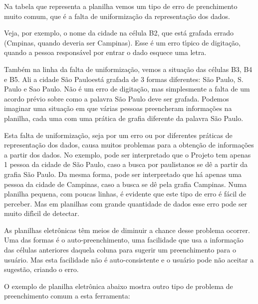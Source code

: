 \documentclass[
12pt,		%
openright,	%
twoside,  %
a4paper,			%
chapter=TITLE,		%
english,			%
french,				%
spanish,			%
brazil				%
]{USPSC-classe/USPSC}
\begin{document}
Na tabela que representa a planilha vemos um tipo de erro de prenchimento muito comum, que \'e a falta de uniformiza\c{c}\~ao da representa\c{c}\~ao dos dados.




Veja, por exemplo, o nome da cidade na c\'elula B2, que est\'a grafada errado (Cmpinas, quando deveria ser Campinas). Esse \'e um erro t\'{\i}pico de digita\c{c}\~ao, quando a pessoa respons\'avel por entrar o dado esquece uma letra.




Tamb\'em na linha da falta de uniformiza\c{c}\~ao, vemos a situa\c{c}\~ao das c\'elulas B3, B4 e B5. Ali a cidade \textquotedbl S\~ao Paulo\textquotedbl  est\'a grafada de 3 formas diferentes: S\~ao Paulo, S. Paulo e Sao Paulo. N\~ao \'e um erro de digita\c{c}\~ao, mas simplesmente a falta de um acordo pr\'evio sobre como a palavra S\~ao Paulo deve ser grafada. Podemos imaginar uma situa\c{c}\~ao em que v\'arias pessoas preencheram informa\c{c}\~oes na planilha, cada uma com uma pr\'atica de grafia diferente da palavra S\~ao Paulo.




Esta falta de uniformiza\c{c}\~ao, seja por um erro ou por diferentes pr\'aticas de representa\c{c}\~ao dos dados, causa muitos problemas para a obten\c{c}\~ao de informa\c{c}\~oes a partir dos dados. No exemplo, pode ser interpretado que o Projeto tem apenas 1 pessoa da cidade de S\~ao Paulo, caso a busca por paulistanos se d\^e a partir da grafia \textquotedbl S\~ao Paulo\textquotedbl . Da mesma forma, pode ser interpretado que h\'a apenas uma pessoa da cidade de Campinas, caso a busca se d\^e pela grafia \textquotedbl Campinas\textquotedbl . Numa planilha pequena, com poucas linhas, \'e evidente que este tipo de erro \'e f\'acil de perceber. Mas em planilhas com grande quantidade de dados esse erro pode ser muito dif\'{\i}cil de detectar.




As planilhas eletr\^onicas t\^em meios de diminuir a chance desse problema ocorrer. Uma das formas \'e o auto-preenchimento, uma facilidade que usa a informa\c{c}\~ao das c\'elulas anteriores daquela coluna para sugerir um preenchimento para o usu\'ario. Mas esta facilidade n\~ao \'e auto-consistente e o usu\'ario pode n\~ao aceitar a sugest\~ao, criando o erro.




O exemplo de planilha eletr\^onica abaixo mostra outro tipo de problema de preenchimento comum a esta ferramenta:
\end{document}
